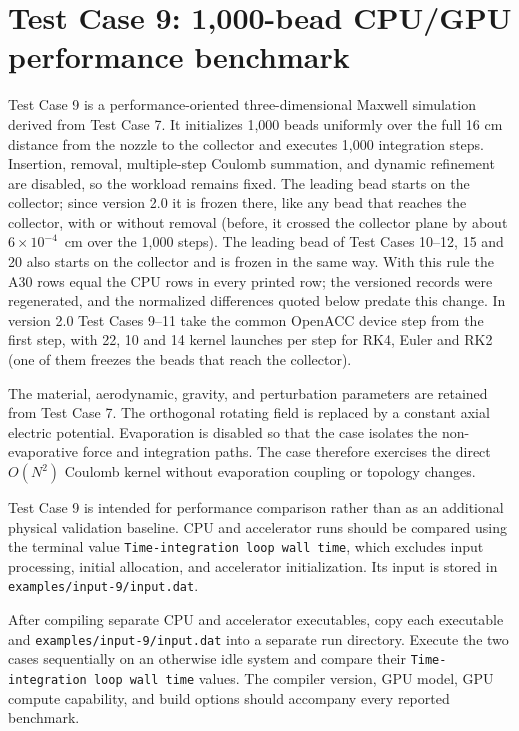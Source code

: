 \section{Test Case 9: 1,000-bead CPU/GPU performance benchmark\label{sec:Test-Case-9}}

Test Case 9 is a performance-oriented three-dimensional Maxwell simulation
derived from Test Case 7. It initializes 1,000 beads uniformly over the full
16 cm distance from the nozzle to the collector and executes 1,000 integration
steps. Insertion, removal, multiple-step Coulomb summation, and dynamic
refinement are disabled, so the workload remains fixed. The leading bead
starts on the collector; since version 2.0 it is frozen there, like any
bead that reaches the collector, with or without removal (before, it crossed
the collector plane by about $6\times10^{-4}$~cm over the 1,000 steps). The
leading bead of Test Cases 10--12, 15 and 20 also starts on the collector
and is frozen in the same way. With this rule the A30 rows equal the CPU
rows in every printed row; the versioned records were regenerated, and the
normalized differences quoted below predate this change. In version 2.0
Test Cases 9--11 take the common OpenACC device step from the first step,
with 22, 10 and 14 kernel launches per step for RK4, Euler and RK2 (one of
them freezes the beads that reach the collector).

The material, aerodynamic, gravity, and perturbation parameters are retained
from Test Case 7. The orthogonal rotating field is replaced by a constant
axial electric potential. Evaporation is disabled so that the case isolates
the non-evaporative force and integration paths. The case therefore exercises
the direct $O(N^2)$ Coulomb kernel without evaporation coupling or topology
changes.

Test Case 9 is intended for performance comparison rather than as an
additional physical validation baseline. CPU and accelerator runs should be
compared using the terminal value \texttt{Time-integration loop wall time},
which excludes input processing, initial allocation, and accelerator
initialization. Its input is stored in
\texttt{examples/input-9/input.dat}.

After compiling separate CPU and accelerator executables, copy each executable
and \texttt{examples/input-9/input.dat} into a separate run directory. Execute
the two cases sequentially on an otherwise idle system and compare their
\texttt{Time-integration loop wall time} values. The compiler version, GPU
model, GPU compute capability, and build options should accompany every
reported benchmark.

